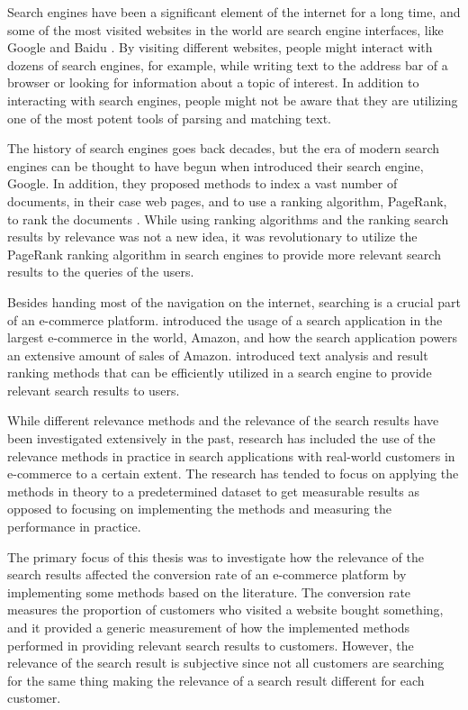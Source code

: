 
Search engines have been a significant element of the internet for a long time, 
and some of the most visited websites in the world are search engine interfaces, 
like Google and Baidu \cite{alexa}.
By visiting different websites, people might interact with dozens of search engines, 
for example, while writing text to the address bar of a browser or looking for information about a topic of interest.
In addition to interacting with search engines, people might not be aware that they are utilizing one of the most 
potent tools of parsing and matching text.


The history of search engines goes back decades, but the era of modern search engines can be thought to have begun
when \citeauthor{googleInit} \cite{googleInit} introduced their search engine, Google. 
In addition, they proposed methods to index a vast number of documents, in their case web pages, 
and to use a ranking algorithm, PageRank, to rank the documents \cite{googleInit}. 
While using ranking algorithms and the ranking search results by relevance was not a new idea, 
it was revolutionary to utilize the PageRank ranking algorithm in search engines to provide 
more relevant search results to the queries of the users.


Besides handing most of the navigation on the internet, 
searching is a crucial part of an e-commerce platform. 
\citeauthor{amazonJoyRanking} \cite{amazonJoyRanking} introduced the usage of a search application 
in the largest e-commerce in the world, Amazon, 
and how the search application powers an extensive amount of sales of Amazon.
\citeauthor{relevantSearch} \cite{relevantSearch} introduced text analysis and result ranking methods
that can be efficiently utilized in a search engine to provide relevant search results to users.


While different relevance methods and the relevance of the search results have been investigated extensively in the past, 
research has included the use of the relevance methods in practice in search applications 
with real-world customers in e-commerce to a certain extent. 
The research has tended to focus on applying the methods in theory to a predetermined dataset to get measurable results
as opposed to focusing on implementing the methods and measuring the performance in practice. 



The primary focus of this thesis was to investigate how the relevance of the search results affected 
the conversion rate of an e-commerce platform by implementing some methods based on the literature. 
The conversion rate measures the proportion of customers who visited a website bought something, 
and it provided a generic measurement of how the implemented methods performed in 
providing relevant search results to customers.
However, the relevance of the search result is subjective 
since not all customers are searching for the same thing making the relevance of a search result 
different for each customer.


